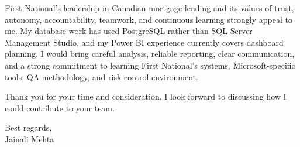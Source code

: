 \documentclass[letterpaper,10pt]{article}
\begin{document}
First National's leadership in Canadian mortgage lending and its values of trust, autonomy, accountability, teamwork, and continuous learning strongly appeal to me. My database work has used PostgreSQL rather than SQL Server Management Studio, and my Power BI experience currently covers dashboard planning. I would bring careful analysis, reliable reporting, clear communication, and a strong commitment to learning First National's systems, Microsoft-specific tools, QA methodology, and risk-control environment.

Thank you for your time and consideration. I look forward to discussing how I could contribute to your team.

Best regards,\\[8pt]
Jainali Mehta
\end{document}
